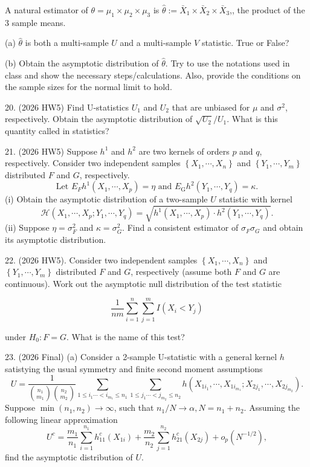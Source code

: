 \documentclass[11pt]{article}
\theoremstyle{definition}
\begin{document}
A natural estimator of $\theta=\mu_1 \times \mu_2 \times \mu_3$ is $\widehat{\theta}:=\bar{X}_1 \times \bar{X}_2 \times \bar{X}_3$,, the product of the 3 sample means.

(a) $\widehat{\theta}$ is both a multi-sample $U$ and a multi-sample $V$ statistic. True or False?

(b) Obtain the asymptotic distribution of $\widehat{\theta}$. Try to use the notations used in class and show the necessary steps/calculations. Also, provide the conditions on the sample sizes for the normal limit to hold.

20. (2026 HW5) Find U-statistics $U_1$ and $U_2$ that are unbiased for $\mu$ and $\sigma^2$, respectively. Obtain the asymptotic distribution of $\sqrt{U_2} / U_1$. What is this quantity called in statistics?

21. (2026 HW5) Suppose $h^1$ and $h^2$ are two kernels of orders $p$ and $q$, respectively. Consider two independent samples $\left\{X_1, \cdots, X_n\right\}$ and $\left\{Y_1, \cdots, Y_m\right\}$ distributed $F$ and $G$, respectively.
$$
\text { Let } E_F h^1\left(X_1, \cdots, X_p\right)=\eta \text { and } E_{\mathrm{G}} h^2\left(Y_1, \cdots, Y_q\right)=\kappa \text {. }
$$
(i) Obtain the asymptotic distribution of a two-sample $U$ statistic with kernel
$$
\mathcal{H}\left(X_1, \cdots, X_p ; Y_1, \cdots, Y_q\right)=\sqrt{h^1\left(X_1, \cdots, X_p\right) \cdot h^2\left(Y_1, \cdots, Y_q\right)} .
$$
(ii) Suppose $\eta=\sigma_F^2$ and $\kappa=\sigma_G^2$. Find a consistent estimator of $\sigma_F \sigma_G$ and obtain its asymptotic distribution.

22. (2026 HW5). Consider two independent samples $\left\{X_1, \cdots, X_n\right\}$ and $\left\{Y_1, \cdots, Y_m\right\}$ distributed $F$ and $G$, respectively (assume both $F$ and $G$ are continuous). Work out the asymptotic null distribution of the test statistic

$$
\frac{1}{n m} \sum_{i=1}^n \sum_{j=1}^m I\left(X_i<Y_j\right)
$$

under $H_0: F=G$. What is the name of this test?

23. (2026 Final) (a) Consider a 2-sample U-statistic with a general kernel $h$ satistying the usual symmetry and finite second moment assumptions
$$
U=\frac{1}{\binom{n_1}{m_1}\binom{n_2}{m_2}} \sum_{1 \leq i_1 \cdots<i_{m_1} \leq n_1} \sum_{1 \leq j_1 \cdots<j_{m_2} \leq n_2} h\left(X_{1 i_1}, \cdots, X_{1 i_{m_1}} ; X_{2 j_1}, \cdots, X_{2 j_{m_2}}\right) .
$$
Suppose $\min \left(n_1, n_2\right) \rightarrow \infty$, such that $n_1 / N \rightarrow \alpha, N=n_1+n_2$.
Assuming the following linear approximation
$$
U^c=\frac{m_1}{n_1} \sum_{i=1}^{n_1} h_{11}^c\left(X_{1 i}\right)+\frac{m_2}{n_2} \sum_{j=1}^{n_2} h_{21}^c\left(X_{2 j}\right)+o_p\left(N^{-1 / 2}\right),
$$
find the asymptotic distribution of $U$.
\end{document}
